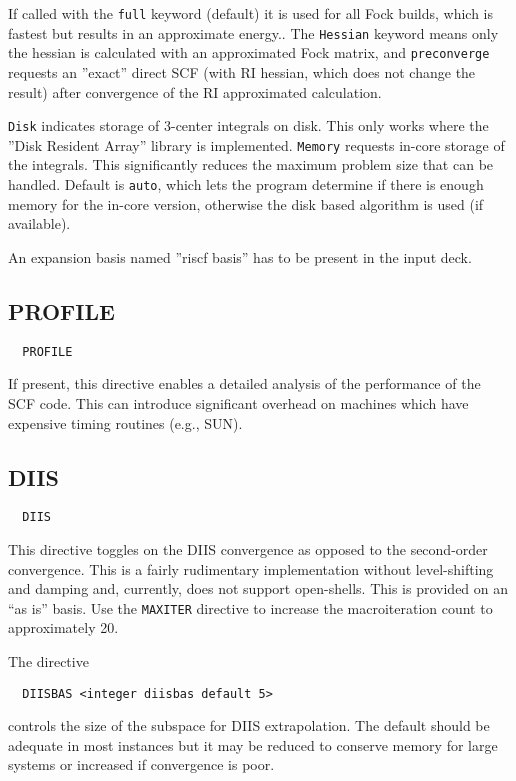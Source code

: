 If called with the \verb+full+ keyword (default)  it is used for all
Fock builds, which is 
fastest but results in an approximate energy.. The \verb+Hessian+ keyword
means only the hessian is calculated with an approximated Fock matrix, and
\verb+preconverge+ requests an ''exact'' direct SCF (with RI hessian, which
does not change the result) after convergence of the
RI approximated calculation.

\verb+Disk+ indicates storage of 3-center integrals on disk. This only
works where the ''Disk Resident Array'' library is implemented. \verb+Memory+
requests in-core storage of the integrals. This
significantly reduces the maximum problem size that can be handled.
Default is \verb+auto+, which lets the program determine if there is
enough memory for the in-core version, otherwise the disk based
algorithm is used (if available).

An expansion basis named ''riscf basis'' has to be present in the input deck.

\subsection{PROFILE}

\begin{verbatim}
  PROFILE
\end{verbatim}

If present, this directive enables a detailed analysis of the
performance of the SCF code.  This can introduce significant
overhead on machines which have expensive timing routines (e.g., SUN).

\subsection{DIIS}
\begin{verbatim}
  DIIS
\end{verbatim}

This directive toggles on the DIIS convergence as opposed to the
second-order convergence. This is a fairly rudimentary implementation
without level-shifting and damping and, currently, does not support
open-shells. This is provided on an ``as is'' basis. Use the
\verb+MAXITER+ directive to increase the macroiteration count to
approximately 20.

The directive
\begin{verbatim}
  DIISBAS <integer diisbas default 5>
\end{verbatim}
controls the size of the subspace for DIIS extrapolation.  The default
should be adequate in most instances but it may be reduced to conserve
memory for large systems or increased if convergence is poor.

